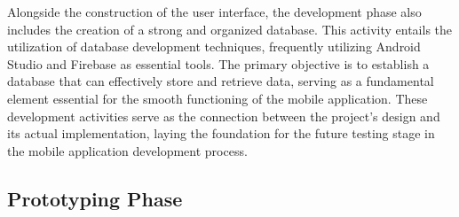 Alongside the construction of the user interface, the development phase also includes the creation of a strong and organized database. This activity entails the utilization of database development techniques, frequently utilizing Android Studio and Firebase as essential tools. The primary objective is to establish a database that can effectively store and retrieve data, serving as a fundamental element essential for the smooth functioning of the mobile application. These development activities serve as the connection between the project's design and its actual implementation, laying the foundation for the future testing stage in the mobile application development process.
\pagebreak

\subsection{Prototyping Phase}
